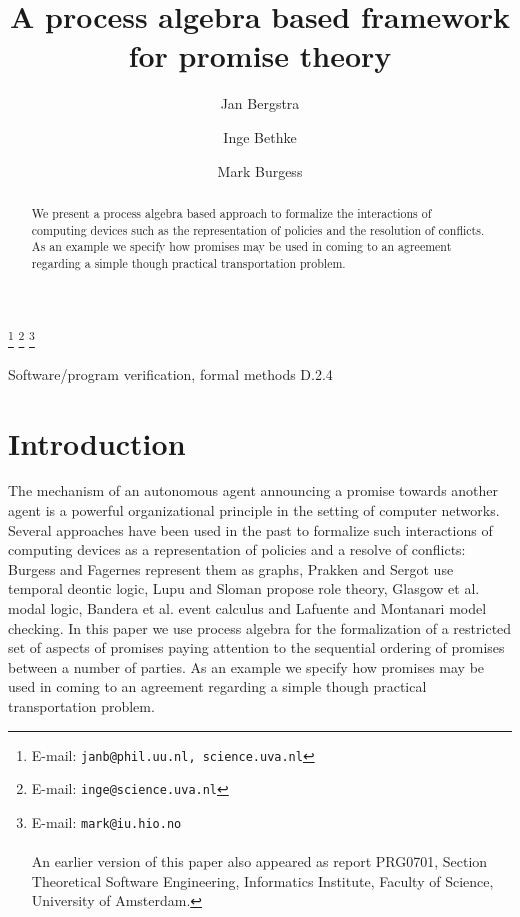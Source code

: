 \documentclass{pseudoelsart}
\begin{document}
 
\begin{frontmatter} 
\title{A process algebra based framework for promise theory}
\author[label1,label2]{Jan  Bergstra} 
\author[label1]{Inge Bethke}
\author[label3]{Mark Burgess}
\thanks[email1]{E-mail: \texttt{janb@}\texttt{phil.uu.nl, science.uva.nl}}
\thanks[email2]{E-mail:  \texttt{inge@science.uva.nl}}
\thanks[email3]{E-mail:  \texttt{mark@iu.hio.no}\\
\mbox{}\\
An earlier version 
of this paper also appeared as report PRG0701, Section Theoretical Software Engineering, 
Informatics Institute, 
Faculty of Science, University of Amsterdam.}
\address[label1]{University of Amsterdam, Faculty of Science, Section Theoretical
Software
Engineering (former Programming Research Group)} 
\address[label2]{Utrecht University, Department of Philosophy, Applied Logic
Group}
\address[label3]{University College Oslo, Faculty of Engineering}
\begin{abstract}
We present a process algebra based approach to formalize the interactions of computing devices
such as the representation of policies and the resolution of conflicts. As an example we specify how
promises may be used in coming to an agreement regarding a simple though
practical transportation problem.
\end{abstract}
\begin{keyword}
Software/program verification, formal methods D.2.4
\end{keyword}
\end{frontmatter}
\section{Introduction}
The mechanism of an autonomous agent announcing a promise towards another agent
is a powerful organizational principle in the setting of computer networks.
Several approaches have been used in the past to formalize such interactions of
computing devices as a
representation of policies and a resolve of conflicts: 
Burgess and Fagernes \cite{BF06}
represent them as graphs, Prakken and Sergot \cite{PS96,PS97} use temporal
deontic logic, Lupu and Sloman \cite{LS97} propose role theory, Glasgow et al.
\cite{GMP92} modal logic, Bandera et al. \cite{BLMR04} event
calculus and  Lafuente and Montanari \cite{LM05} model checking.
In this paper we use process algebra \cite{BPS01} for the formalization of a
restricted set of aspects of promises paying attention to the sequential
ordering of promises between a number of parties. As an example we specify how
promises may be used in coming to an agreement regarding a simple though
practical transportation problem.
\end{document}
